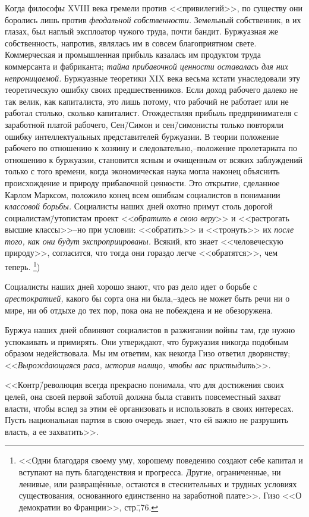 Когда философы XVIII века гремели против <<привилегий>>, по существу они боролись лишь против \emph{феодальной собственности.} Земельный собственник, в их глазах, был наглый эксплоатор чужого труда, почти бандит. Буржуазная же собственность, напротив, являлась им в совсем благоприятном свете. Коммерческая и промышленная прибыль казалась им продуктом труда коммерсанта и фабриканта; \emph{тайна прибавочной ценности оставалась для них непроницаемой.} Буржуазные теоретики XIX века весьма кстати унаследовали эту теоретическую ошибку своих предшественников. Если доход рабочего далеко не так велик, как капиталиста, это лишь потому, что рабочий не работает или не работал столько, сколько капиталист. Отождествляя прибыль предпринимателя с заработной платой рабочего, Сен\=/Симон и сен\=/симонисты только повторяли ошибку интеллектуальных представителей буржуазии. В теории положение рабочего по отношению к хозяину и следовательно,\---положение пролетариата по отношению к буржуазии, становится ясным и очищенным от всяких заблуждений только с того времени, когда экономическая наука могла наконец объяснить происхождение и природу прибавочной ценности. Это открытие, сделанное Карлом Марксом, положило конец всем ошибкам социалистов в понимании \emph{классовой борьбы.} Социалисты наших дней охотно примут столь дорогой социалистам\=/утопистам проект <<\emph{обратить в свою веру}>> и <<растрогать высшие классы>>\---но при условии: <<обратить>> и <<тронуть>> их \emph{после того, как они будут экспроприированы.} Всякий, кто знает <<человеческую природу>>, согласится, что тогда они гораздо легче <<обратятся>>, чем теперь. \footnote{<<Одни благодаря своему уму, хорошему поведению создают себе капитал и вступают на путь благоденствия и прогресса. Другие, ограниченные, ни ленивые, или развращённые, остаются в стеснительных и трудных условиях существования, основанного единственно на заработной плате>>. Гизо <<О демократии во Франции>>, стр.\=,76.})

Социалисты наших дней хорошо знают, что раз дело идет о борьбе с \emph{арестократией,} какого бы сорта она ни была,\---здесь не может быть речи ни о мире, ни об отдыхе до тех пор, пока она не побеждена и не обезоружена.

Буржуа наших дней обвиняют социалистов в разжигании войны там, где нужно успокаивать и примирять. Они утверждают, что буржуазия никогда подобным образом недействовала. Мы им ответим, как некогда Гизо ответил дворянству; <<\emph{Вырождающаяся раса, история налицо, чтобы вас пристыдить}>>.

<<Контр\=/революция всегда прекрасно понимала, что для достижения своих целей, она своей первой заботой должна была ставить повсеместный захват власти, чтобы вслед за этим её организовать и использовать в своих интересах. Пусть национальная партия в свою очередь знает, что ей важно не разрушить власть, а ее захватить>>.

